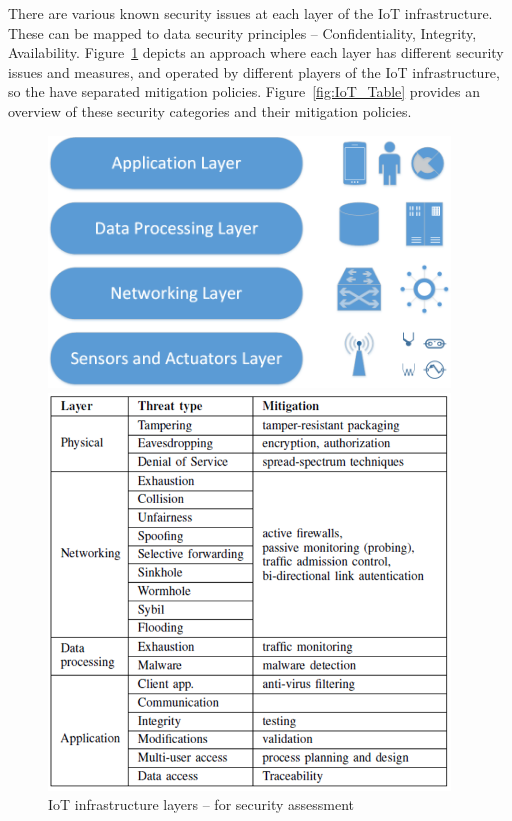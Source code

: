 \documentclass[a4paper]{article}
\begin{document}
There are various known security issues at each layer of the IoT infrastructure. These can be mapped to data security principles -- Confidentiality, Integrity, Availability. Figure~\ref{fig:IoT_Layers} depicts an approach where each layer has different security issues and measures, and operated by different players of the IoT infrastructure, so the have separated mitigation policies. Figure~\ref{fig:IoT_Table} provides an overview of these security categories and their mitigation policies.

\begin{figure}[H]
    \begin{minipage}{0.48\textwidth}
     \centering
     \includegraphics[width=0.95\textwidth]{figures/IoT_Layers.png}
     \caption{IoT infrastructure layers -- for security assessment \cite{IoT_Security}}
     \label{fig:IoT_Layers}
    \end{minipage}\hfill    
    \begin{minipage}{0.48\textwidth}
     \centering
     \includegraphics[width=0.95\textwidth]{figures/IoT_Security_Layer_Table.png}

\end{minipage}
\end{figure}
\end{document}
